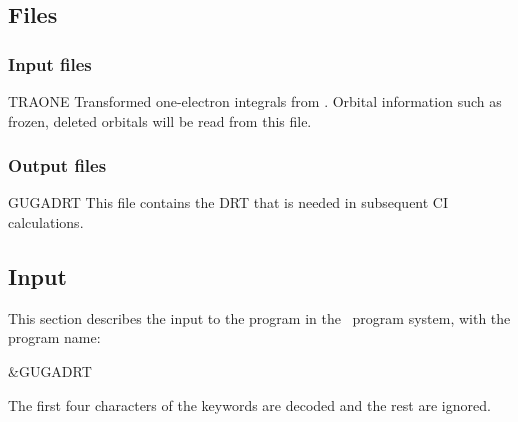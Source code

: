 \subsection{Files}
\label{UG:sec:gugadrt_files}
\subsubsection{Input files}

\begin{filelist}
\item[TRAONE]
 {Transformed one-{}electron integrals from . Orbital information
  such as frozen, deleted orbitals will be read from this file.}
\end{filelist}

\subsubsection{Output files}
\begin{filelist}
\item[GUGADRT]
This file contains the DRT that is needed in
subsequent CI calculations.
\end{filelist}

\subsection{Input}
\label{UG:sec:gugadrt_input}
This section describes the input to the
 program in the \molcas\ program system, with the program name:
\begin{inputlisting}
 &GUGADRT
\end{inputlisting}

The first four characters of the keywords are
decoded and the rest are ignored.

